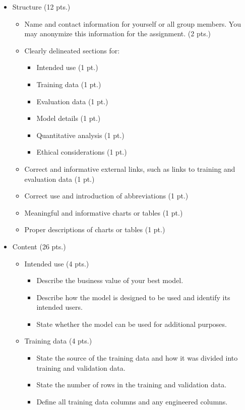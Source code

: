 \documentclass[fleqn]{article}
\begin{document}
\begin{itemize}
\item Structure (12 pts.)
\begin{itemize}
\item Name and contact information for yourself or all group members. You may anonymize this information for the assignment. (2 pts.)
\item Clearly delineated sections for:
\begin{itemize}
\item Intended use (1 pt.)
\item Training data (1 pt.)
\item Evaluation data (1 pt.)
\item Model details (1 pt.)
\item Quantitative analysis (1 pt.)
\item Ethical considerations (1 pt.)
\end{itemize}
\item Correct and informative external links, such as links to training and evaluation data (1 pt.)
\item Correct use and introduction of abbreviations (1 pt.)
\item Meaningful and informative charts or tables (1 pt.)
\item Proper descriptions of charts or tables (1 pt.)
\end{itemize}

\item Content (26 pts.)
\begin{itemize}
\item Intended use (4 pts.)
\begin{itemize}
\item Describe the business value of your best model.
\item Describe how the model is designed to be used and identify its intended users.
\item State whether the model can be used for additional purposes.
\end{itemize}

\item Training data (4 pts.)
\begin{itemize}
\item State the source of the training data and how it was divided into training and validation data.
\item State the number of rows in the training and validation data.
\item Define all training data columns and any engineered columns.
\end{itemize}


\end{itemize}
\end{itemize}
\end{document}
